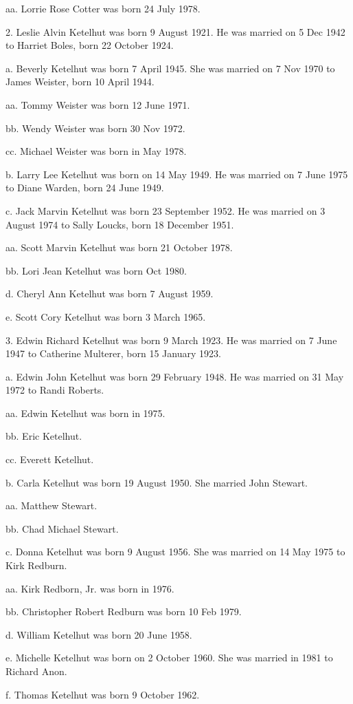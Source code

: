 \documentclass[a4paper]{article}
\begin{document}
aa. Lorrie Rose Cotter was born 24 July 1978.

2. Leslie Alvin Ketelhut was born 9 August 1921.  He was married on 5 Dec 1942 to Harriet Boles, born 22 October 1924.

a. Beverly Ketelhut was born 7 April 1945.  She was married on 7 Nov 1970 to James Weister, born 10 April 1944.

aa. Tommy Weister was born 12 June 1971.

bb. Wendy Weister was born 30 Nov 1972.

cc.  Michael Weister was born in May 1978.

b. Larry Lee Ketelhut was born on 14 May 1949.  He was married on 7 June 1975 to Diane Warden, born 24 June 1949.

c. Jack Marvin Ketelhut was born 23 September 1952.  He was married on 3 August 1974 to Sally Loucks, born 18 December 1951.

aa. Scott Marvin Ketelhut was born 21 October 1978.

bb. Lori  Jean Ketelhut was born Oct 1980.

d. Cheryl Ann Ketelhut was born 7 August 1959.

e. Scott Cory Ketelhut was born 3 March 1965.

3. Edwin Richard Ketelhut was born 9 March 1923.  He was married on 7 June 1947 to Catherine Multerer, born 15 January 1923.

a. Edwin John Ketelhut was born 29 February 1948.  He was married on 31 May 1972 to Randi Roberts.

aa. Edwin Ketelhut was born in 1975.

bb. Eric Ketelhut.

cc. Everett Ketelhut.

b.  Carla Ketelhut was born 19 August 1950.  She married John Stewart.

aa.  Matthew Stewart.

bb. Chad Michael Stewart.

c. Donna Ketelhut was born 9 August 1956.  She was married on 14 May 1975 to Kirk Redburn.

aa. Kirk Redborn, Jr.  was born in 1976.

bb. Christopher Robert Redburn was born 10 Feb 1979.

d. William Ketelhut was born 20 June 1958.

e. Michelle Ketelhut was born on 2 October 1960.  She was married in 1981 to Richard Anon.

f. Thomas Ketelhut was born 9 October 1962.
\end{document}
